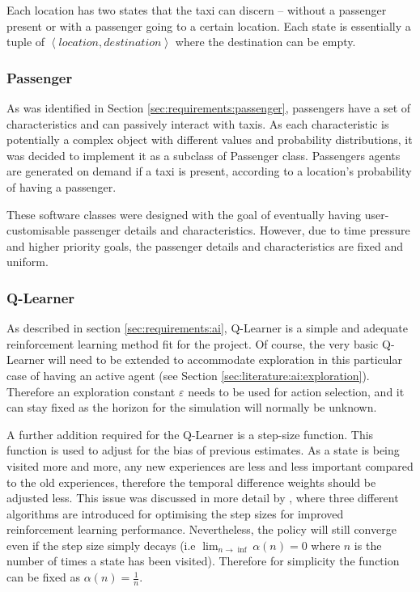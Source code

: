 Each location has two states that the taxi can discern -- without a passenger
present or with a passenger going to a certain location. Each state is
essentially a tuple of \(\left \langle location, destination \right \rangle\)
where the destination can be empty.


\subsubsection{Passenger}
\label{sec:implementation:passenger}

As was identified in Section \ref{sec:requirements:passenger}, passengers have
a set of characteristics and can passively interact with taxis. As each
characteristic is potentially a complex object with different values and
probability distributions, it was decided to implement it as a subclass of
Passenger class. Passengers agents are generated on demand if a taxi is
present, according to a location's probability of having a passenger.

These software classes were designed with the goal of eventually having user-
customisable passenger details and characteristics. However, due to time
pressure and higher priority goals, the passenger details and characteristics
are fixed and uniform.


\subsubsection{Q-Learner}
\label{sec:implementation:ai}

As described in section \ref{sec:requirements:ai}, Q-Learner is a simple and
adequate reinforcement learning method fit for the project. Of course, the very
basic Q-Learner will need to be extended to accommodate exploration in this
particular case of having an active agent (see Section
\ref{sec:literature:ai:exploration}). Therefore an exploration constant
\(\varepsilon\) needs to be used for action selection, and it can stay fixed as
the horizon for the simulation will normally be unknown.

A further addition required for the Q-Learner is a step-size function. This
function is used to adjust for the bias of previous estimates. As a state is
being visited more and more, any new experiences are less and less important
compared to the old experiences, therefore the temporal difference weights
should be adjusted less. This issue was discussed in more detail by
\textcite{Sutton1994ai+stepsize}, where three different algorithms are
introduced for optimising the step sizes for improved reinforcement learning
performance. Nevertheless, the policy will still converge even if the step size
simply decays (i.e \(\lim_{n \to \inf}\alpha(n) = 0\) where \(n\) is the number
of times a state has been visited). Therefore for simplicity the function can
be fixed as \(\alpha(n)=\frac{1}{n}\).

